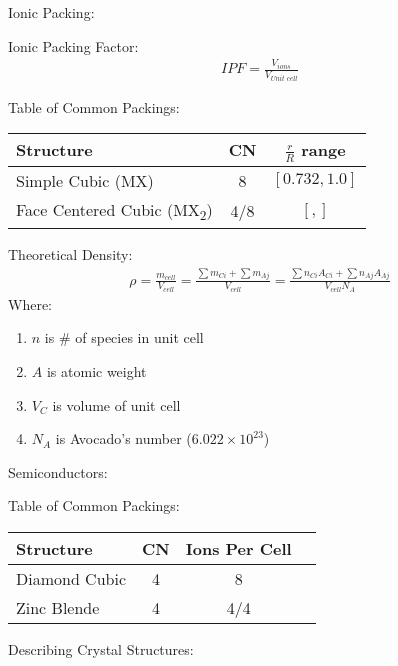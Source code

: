 \documentclass{article}
\begin{document}
\begin{multicols}{2}
Ionic Packing:

Ionic Packing Factor:
\begin{equation*}
    \begin{split}
        \textit{IPF} = \frac{V_\textit{ions}}{V_\textit{Unit cell}} 
    \end{split}
\end{equation*}

Table of Common Packings:
\begin{center}
    \begin{tabular}{ l c c }
        Structure                    & CN  & $\frac{r}{R}$ range \\
        \hline
        Simple Cubic (MX)            & 8   & $[0.732, 1.0]$ \\ 
        Face Centered Cubic 
        (MX\textsubscript{2})        & 4/8 & $[, ]$ \\  
    \end{tabular}
\end{center}

Theoretical Density:
\begin{equation*}
    \begin{split}
        \rho 
        = \frac{m_\textit{cell}}{V_\textit{cell}} 
        = \frac{\sum m_{Ci} + \sum m_{Aj}}{V_{cell}}
        = \frac{\sum n_{Ci}A_{Ci} + \sum n_{Aj}A_{Aj}}{V_{cell} N_A}
    \end{split}
\end{equation*}
Where:
\begin{enumerate}
    \item $n$ is \# of species in unit cell
    \item $A$ is atomic weight
    \item $V_C$ is volume of unit cell
    \item $N_A$ is Avocado's number ($6.022 \times 10^{23}$)
\end{enumerate}

Semiconductors:

Table of Common Packings:
\begin{center}
    \begin{tabular}{ l c c c }
        Structure        & CN & Ions Per Cell \\
        \hline
        Diamond Cubic    & 4  & 8 \\ 
        Zinc Blende      & 4  & 4/4 \\  
    \end{tabular}
\end{center}

Describing Crystal Structures:

\end{multicols}
\end{document}
